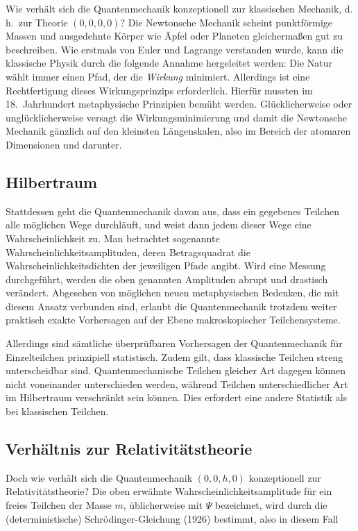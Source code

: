 Wie verhält sich die Quantenmechanik konzeptionell zur klassischen Mechanik, d.\,h.\ zur Theorie $(0,0,0,0)$? Die Newtonsche Mechanik scheint punktförmige Massen und ausgedehnte Körper wie Äpfel oder Planeten gleichermaßen gut zu beschreiben. Wie erstmals von Euler und Lagrange verstanden wurde, kann die klassische Physik durch die folgende Annahme hergeleitet werden: Die Natur wählt immer einen Pfad, der die \emph{Wirkung} minimiert. Allerdings ist eine Rechtfertigung dieses Wirkungsprinzips erforderlich. Hierfür mussten im 18.\ Jahrhundert metaphysische Prinzipien bemüht werden. Glücklicherweise oder unglücklicherweise versagt die Wirkungsminimierung und damit die Newtonsche Mechanik gänzlich auf den kleinsten Längenskalen, also im Bereich der atomaren Dimensionen und darunter.


\subsection*{Hilbertraum}

Stattdessen geht die Quantenmechanik davon aus, dass ein gegebenes Teilchen alle möglichen Wege durchläuft, und weist dann jedem dieser Wege eine Wahrscheinlichkeit zu. Man betrachtet sogenannte Wahrscheinlichkeitsamplituden, deren Betragsquadrat die Wahrscheinlichkeitsdichten der jeweiligen Pfade angibt. Wird eine Messung durchgeführt, werden die oben genannten Amplituden abrupt und drastisch verändert. Abgesehen von möglichen neuen metaphysischen Bedenken, die mit diesem Ansatz verbunden sind, erlaubt die Quantenmechanik trotzdem weiter praktisch exakte Vorhersagen auf der Ebene makroskopischer Teilchensysteme.

Allerdings sind sämtliche überprüfbaren Vorhersagen der Quantenmechanik für Einzelteilchen prinzipiell statistisch. Zudem gilt, dass klassische Teilchen streng unterscheidbar sind. Quantenmechanische Teilchen gleicher Art dagegen können nicht voneinander unterschieden werden, während Teilchen unterschiedlicher Art im Hilbertraum verschränkt sein können. Dies erfordert eine andere Statistik als bei klassischen Teilchen.


\subsection*{Verhältnis zur Relativitätstheorie}

Doch wie verhält sich die Quantenmechanik $(0,0,h,0)$ konzeptionell zur Relativitätstheorie? Die oben erwähnte Wahrscheinlichkeitsamplitude für ein freies Teilchen der Masse $m$, üblicherweise mit $\Psi$ bezeichnet, wird durch die (deterministische) Schrödinger-Gleichung (1926) bestimmt, also in diesem Fall

